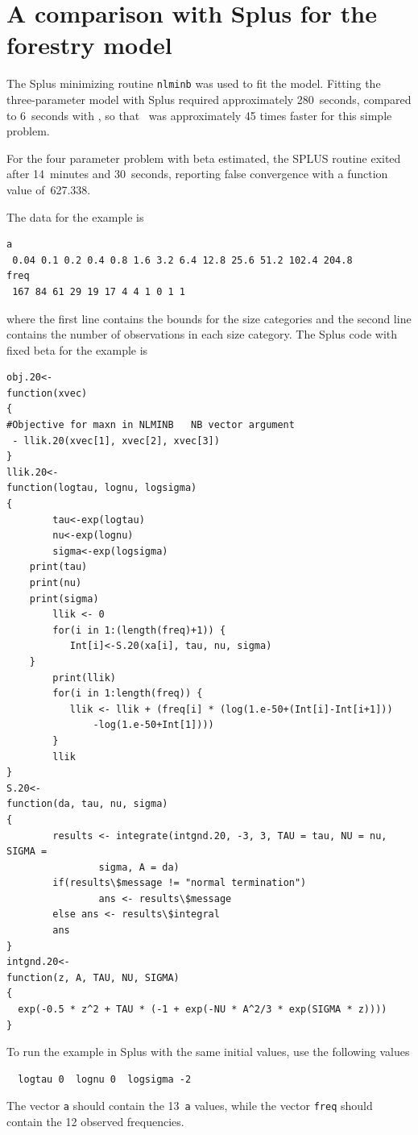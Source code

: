 \documentclass{admbmanual}
\begin{document}
\section{A comparison with Splus for the forestry model}

The Splus minimizing routine \texttt{nlminb} was used to fit the model. Fitting
the three-parameter model with Splus required approximately 280~seconds,
compared to 6~seconds with \ADM, so that \ADM\ was approximately 45 times faster
for this simple problem.

For the four parameter problem with beta estimated, the SPLUS routine exited
after 14~minutes and 30~seconds, reporting false convergence with a function
value of~627.338.

The data for the example is
\begin{lstlisting}
a
 0.04 0.1 0.2 0.4 0.8 1.6 3.2 6.4 12.8 25.6 51.2 102.4 204.8
freq
 167 84 61 29 19 17 4 4 1 0 1 1
\end{lstlisting}
where the first line contains the bounds for the size categories and the second
line contains the number of observations in each size category. The Splus code
with fixed beta for the example is
\begin{lstlisting}
obj.20<-
function(xvec)
{
#Objective for maxn in NLMINB   NB vector argument
 - llik.20(xvec[1], xvec[2], xvec[3])
}
llik.20<-
function(logtau, lognu, logsigma)
{
        tau<-exp(logtau)
        nu<-exp(lognu)
        sigma<-exp(logsigma)
	print(tau)
	print(nu)
	print(sigma)
        llik <- 0
        for(i in 1:(length(freq)+1)) {
           Int[i]<-S.20(xa[i], tau, nu, sigma)
	}
        print(llik)
        for(i in 1:length(freq)) {
           llik <- llik + (freq[i] * (log(1.e-50+(Int[i]-Int[i+1]))
               -log(1.e-50+Int[1])))
        }
        llik
}
S.20<-
function(da, tau, nu, sigma)
{
        results <- integrate(intgnd.20, -3, 3, TAU = tau, NU = nu, SIGMA =
                sigma, A = da)
        if(results\$message != "normal termination")
                ans <- results\$message
        else ans <- results\$integral
        ans
}
intgnd.20<-
function(z, A, TAU, NU, SIGMA)
{
  exp(-0.5 * z^2 + TAU * (-1 + exp(-NU * A^2/3 * exp(SIGMA * z))))
}
\end{lstlisting}
To run the example in Splus with the same initial values, use the following
values
\begin{lstlisting}
  logtau 0  lognu 0  logsigma -2
\end{lstlisting}
The vector \texttt{a} should contain the 13~\texttt{a} values, while the vector
\texttt{freq} should contain the 12 observed frequencies.
\end{document}
